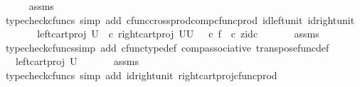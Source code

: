 \begin{isabellebody}
\ \ \ \ \isamarkupfalse%
\ assms\ \isamarkupfalse%
\ {\isacharparenleft}{\kern0pt}typecheck{\isacharunderscore}{\kern0pt}cfuncs{\isacharcomma}{\kern0pt}\ simp\ add{\isacharcolon}{\kern0pt}\ cfunc{\isacharunderscore}{\kern0pt}cross{\isacharunderscore}{\kern0pt}prod{\isacharunderscore}{\kern0pt}comp{\isacharunderscore}{\kern0pt}cfunc{\isacharunderscore}{\kern0pt}prod\ id{\isacharunderscore}{\kern0pt}left{\isacharunderscore}{\kern0pt}unit{}\ id{\isacharunderscore}{\kern0pt}right{\isacharunderscore}{\kern0pt}unit{}{\isacharparenright}{\kern0pt}\isanewline
\ \ \isamarkupfalse%
\ \isamarkupfalse%
\ {\isachardoublequoteopen}{\isachardot}{\kern0pt}{\isachardot}{\kern0pt}{\isachardot}{\kern0pt}\ {\isacharequal}{\kern0pt}\ {\isacharparenleft}{\kern0pt}left{\isacharunderscore}{\kern0pt}cart{\isacharunderscore}{\kern0pt}proj\ {\isacharparenleft}{\kern0pt}U{\isacharparenright}{\kern0pt}\ {\isasymone}{\isacharparenright}{\kern0pt}\isactrlsup {\isasymsharp}\ {\isasymcirc}\isactrlsub c\ {\isacharparenleft}{\kern0pt}right{\isacharunderscore}{\kern0pt}cart{\isacharunderscore}{\kern0pt}proj\ {\isacharparenleft}{\kern0pt}U\isactrlbsup U\isactrlesup {\isacharparenright}{\kern0pt}\ {\isasymone}{\isacharparenright}{\kern0pt}\ \ {\isasymcirc}\isactrlsub c\ {\isasymlangle}f\ \ {\isasymcirc}\isactrlsub c\ z{\isacharcomma}{\kern0pt}id\isactrlsub c\ {\isasymone}{\isasymrangle}{\isachardoublequoteclose}\isanewline
\ \ \ \ \isamarkupfalse%
\ assms\ \isamarkupfalse%
\ {\isacharparenleft}{\kern0pt}typecheck{\isacharunderscore}{\kern0pt}cfuncs{\isacharcomma}{\kern0pt}simp\ add{\isacharcolon}{\kern0pt}\ cfunc{\isacharunderscore}{\kern0pt}type{\isacharunderscore}{\kern0pt}def\ comp{\isacharunderscore}{\kern0pt}associative\ transpose{\isacharunderscore}{\kern0pt}func{\isacharunderscore}{\kern0pt}def{\isacharparenright}{\kern0pt}\isanewline
\ \ \isamarkupfalse%
\ \isamarkupfalse%
\ {\isachardoublequoteopen}{\isachardot}{\kern0pt}{\isachardot}{\kern0pt}{\isachardot}{\kern0pt}\ {\isacharequal}{\kern0pt}\ {\isacharparenleft}{\kern0pt}left{\isacharunderscore}{\kern0pt}cart{\isacharunderscore}{\kern0pt}proj\ {\isacharparenleft}{\kern0pt}U{\isacharparenright}{\kern0pt}\ {\isasymone}{\isacharparenright}{\kern0pt}\isactrlsup {\isasymsharp}{\isachardoublequoteclose}\isanewline
\ \ \ \ \isamarkupfalse%
\ assms\ \isamarkupfalse%
\ {\isacharparenleft}{\kern0pt}typecheck{\isacharunderscore}{\kern0pt}cfuncs{\isacharcomma}{\kern0pt}\ simp\ add{\isacharcolon}{\kern0pt}\ id{\isacharunderscore}{\kern0pt}right{\isacharunderscore}{\kern0pt}unit{}\ right{\isacharunderscore}{\kern0pt}cart{\isacharunderscore}{\kern0pt}proj{\isacharunderscore}{\kern0pt}cfunc{\isacharunderscore}{\kern0pt}prod{\isacharparenright}{\kern0pt}\isanewline

\end{isabellebody}
